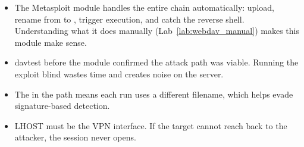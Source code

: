 \begin{takebox}
\begin{itemize}
  \item The Metasploit module handles the entire chain automatically: upload,
        rename from  to , trigger execution, and catch the
        reverse shell. Understanding what it does manually (Lab~\ref{lab:webdav_manual})
        makes this module make sense.
  \item davtest before the module confirmed the attack path was viable. Running
        the exploit blind wastes time and creates noise on the server.
  \item The  in the path means each run uses a different filename,
        which helps evade signature-based detection.
  \item LHOST must be the VPN interface. If the target cannot reach back to the
        attacker, the session never opens.
\end{itemize}
\end{takebox}
